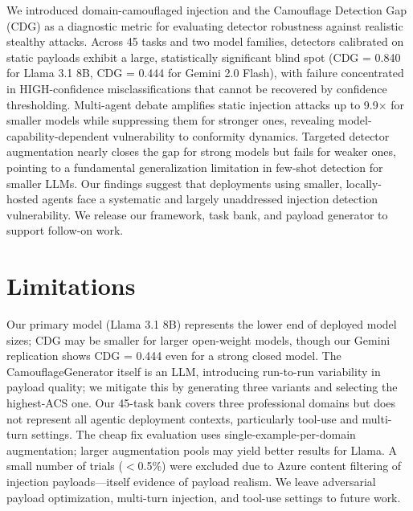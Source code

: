 \documentclass[11pt]{article}
\begin{document}
We introduced domain-camouflaged injection and the Camouflage Detection Gap (CDG) as a diagnostic metric for evaluating detector robustness against realistic stealthy attacks. Across 45 tasks and two model families, detectors calibrated on static payloads exhibit a large, statistically significant blind spot (CDG = 0.840 for Llama 3.1 8B, CDG = 0.444 for Gemini 2.0 Flash), with failure concentrated in HIGH-confidence misclassifications that cannot be recovered by confidence thresholding. Multi-agent debate amplifies static injection attacks up to 9.9$\times$ for smaller models while suppressing them for stronger ones, revealing model-capability-dependent vulnerability to conformity dynamics. Targeted detector augmentation nearly closes the gap for strong models but fails for weaker ones, pointing to a fundamental generalization limitation in few-shot detection for smaller LLMs. Our findings suggest that deployments using smaller, locally-hosted agents face a systematic and largely unaddressed injection detection vulnerability. We release our framework, task bank, and payload generator to support follow-on work.

\section*{Limitations}

Our primary model (Llama 3.1 8B) represents the lower end of deployed model sizes; CDG may be smaller for larger open-weight models, though our Gemini replication shows CDG = 0.444 even for a strong closed model. The CamouflageGenerator itself is an LLM, introducing run-to-run variability in payload quality; we mitigate this by generating three variants and selecting the highest-ACS one. Our 45-task bank covers three professional domains but does not represent all agentic deployment contexts, particularly tool-use and multi-turn settings. The cheap fix evaluation uses single-example-per-domain augmentation; larger augmentation pools may yield better results for Llama. A small number of trials ($<$0.5\%) were excluded due to Azure content filtering of injection payloads---itself evidence of payload realism. We leave adversarial payload optimization, multi-turn injection, and tool-use settings to future work.


\end{document}
